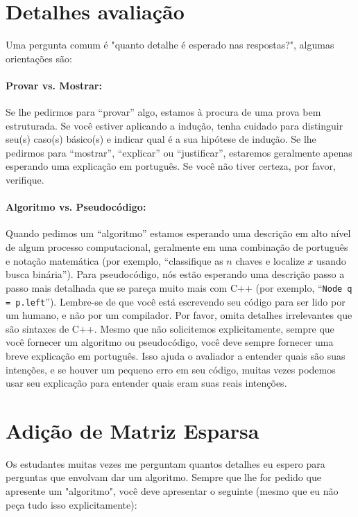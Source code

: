 \documentclass{article}
\begin{document}
\newpage
\appendix

\section{Detalhes avaliação}
Uma pergunta comum é "quanto detalhe é esperado nas respostas?", algumas orientações são:
%
\paragraph{Provar vs. Mostrar:}
Se lhe pedirmos para “provar” algo, estamos à procura de uma prova bem estruturada. Se você estiver aplicando a indução, tenha cuidado para distinguir seu(s) caso(s) básico(s) e indicar qual é a sua hipótese de indução. Se lhe pedirmos para “mostrar”, “explicar” ou “justificar”, estaremos geralmente apenas esperando uma explicação em português. Se você não tiver certeza, por favor, verifique.

\paragraph{Algoritmo vs. Pseudocódigo:} Quando pedimos um “algoritmo” estamos esperando uma descrição em alto nível de algum processo computacional, geralmente em uma combinação de português e notação matemática (por exemplo, “classifique as $n$ chaves e localize $x$ usando busca binária”). Para pseudocódigo, nós estão esperando uma descrição passo a passo mais detalhada que se pareça muito mais com C++ (por exemplo, “\texttt{Node q = p.left}”). Lembre-se de que você está escrevendo seu código para ser lido por um humano, e não por um compilador. Por favor, omita detalhes irrelevantes que são sintaxes de C++. Mesmo que não solicitemos explicitamente, sempre que você fornecer um algoritmo ou pseudocódigo, você deve sempre fornecer uma breve explicação em português. Isso ajuda o avaliador a entender quais são suas intenções, e se houver um pequeno erro em seu código, muitas vezes podemos usar seu explicação para entender quais eram suas reais intenções.

\section{Adição de Matriz Esparsa}

Os estudantes muitas vezes me perguntam quantos detalhes eu espero para perguntas que envolvam dar um algoritmo. Sempre que lhe for pedido que apresente um "algoritmo", você deve apresentar o seguinte (mesmo que eu não peça tudo isso explicitamente):
\end{document}

